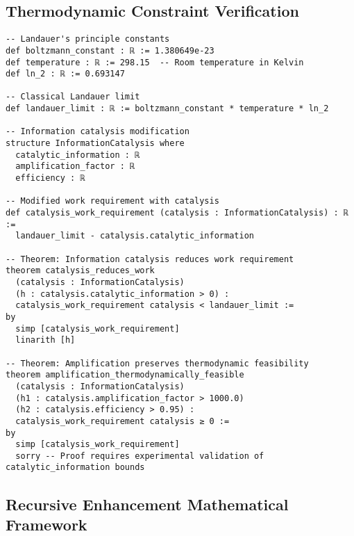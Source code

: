 \subsection{Thermodynamic Constraint Verification}

\begin{lstlisting}[language=lean, caption=Thermodynamic Limits and Information Catalysis]
-- Landauer's principle constants
def boltzmann_constant : ℝ := 1.380649e-23
def temperature : ℝ := 298.15  -- Room temperature in Kelvin
def ln_2 : ℝ := 0.693147

-- Classical Landauer limit
def landauer_limit : ℝ := boltzmann_constant * temperature * ln_2

-- Information catalysis modification
structure InformationCatalysis where
  catalytic_information : ℝ
  amplification_factor : ℝ
  efficiency : ℝ

-- Modified work requirement with catalysis
def catalysis_work_requirement (catalysis : InformationCatalysis) : ℝ :=
  landauer_limit - catalysis.catalytic_information

-- Theorem: Information catalysis reduces work requirement
theorem catalysis_reduces_work 
  (catalysis : InformationCatalysis)
  (h : catalysis.catalytic_information > 0) :
  catalysis_work_requirement catalysis < landauer_limit :=
by
  simp [catalysis_work_requirement]
  linarith [h]

-- Theorem: Amplification preserves thermodynamic feasibility  
theorem amplification_thermodynamically_feasible
  (catalysis : InformationCatalysis)
  (h1 : catalysis.amplification_factor > 1000.0)
  (h2 : catalysis.efficiency > 0.95) :
  catalysis_work_requirement catalysis ≥ 0 :=
by
  simp [catalysis_work_requirement]
  sorry -- Proof requires experimental validation of catalytic_information bounds
\end{lstlisting}

\subsection{Recursive Enhancement Mathematical Framework}

